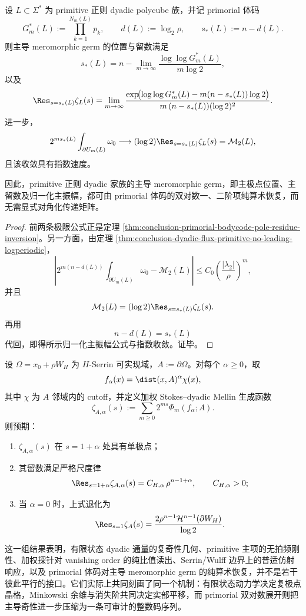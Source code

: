 \begin{theorem}\label{thm:conclusion-primorial-bodycode-dominant-germ-arithmetic-recovery}
设 \(L\subset \Sigma^\ast\) 为 primitive 正则 dyadic polycube 族，并记 primorial 体码
\[
G_m^\ast(L):=\prod_{k=1}^{N_m(L)}p_k,
\qquad
d(L):=\log_2\rho,
\qquad
s_\ast(L):=n-d(L).
\]
则主导 meromorphic germ 的位置与留数满足
\[
s_\ast(L)
=
n-\lim_{m\to\infty}\frac{\log\log G_m^\ast(L)}{m\log 2},
\]
以及
\[
\Res_{s=s_\ast(L)}\zeta_L(s)
=
\lim_{m\to\infty}
\frac{
\exp\!\bigl(\log\log G_m^\ast(L)-m(n-s_\ast(L))\log 2\bigr)
}{
m\,(n-s_\ast(L))(\log 2)^2
}.
\]
进一步，
\[
2^{m s_\ast(L)}\int_{\partial U_m(L)}\omega_0
\longrightarrow
(\log 2)\Res_{s=s_\ast(L)}\zeta_L(s)
=
\mathcal M_2(L),
\]
且该收敛具有指数速度。

因此，primitive 正则 dyadic 家族的主导 meromorphic germ，即主极点位置、主留数及归一化主振幅，都可由 primorial 体码的双对数一、二阶项纯算术恢复，而无需显式对角化传递矩阵。
\end{theorem}
\begin{proof}
前两条极限公式正是定理 \ref{thm:conclusion-primorial-bodycode-pole-residue-inversion}。另一方面，由定理 \ref{thm:conclusion-dyadic-flux-primitive-no-leading-logperiodic}，
\[
\left|
2^{m(n-d(L))}\int_{\partial U_m(L)}\omega_0-\mathcal M_2(L)
\right|
\le
C_0\left(\frac{|\lambda_2|}{\rho}\right)^m,
\]
并且
\[
\mathcal M_2(L)=(\log 2)\Res_{s=s_\ast(L)}\zeta_L(s).
\]
再用
\[
n-d(L)=s_\ast(L)
\]
代回，即得所示归一化主振幅公式与指数收敛。证毕。
\end{proof}

\begin{conjecture}\label{conj:conclusion-serrin-wulff-weighted-mellin-pole-shift}
设 \(\Omega=x_0+\rho W_H\) 为 \(H\)-Serrin 可实现域，\(A:=\partial\Omega\)。对每个 \(\alpha\ge 0\)，取
\[
f_\alpha(x)=\dist(x,A)^\alpha \chi(x),
\]
其中 \(\chi\) 为 \(A\) 邻域内的 cutoff，并定义加权 Stokes--dyadic Mellin 生成函数
\[
\zeta_{A,\alpha}(s):=\sum_{m\ge 0}2^{ms}\Phi_m(f_\alpha;A).
\]
则预期：
\begin{enumerate}
  \item \(\zeta_{A,\alpha}(s)\) 在 \(s=1+\alpha\) 处具有单极点；
  \item 其留数满足严格尺度律
  \[
  \Res_{s=1+\alpha}\zeta_{A,\alpha}(s)=C_{H,\alpha}\,\rho^{n-1+\alpha},
  \qquad
  C_{H,\alpha}>0;
  \]
  \item 当 \(\alpha=0\) 时，上式退化为
  \[
  \Res_{s=1}\zeta_A(s)
  =
  \frac{2\rho^{n-1}\mathcal H^{n-1}(\partial W_H)}{\log 2}.
  \]
\end{enumerate}
\end{conjecture}

\noindent
这一组结果表明，有限状态 dyadic 通量的复奇性几何、primitive 主项的无拍频刚性、加权探针对 vanishing order 的纯比值读出、Serrin/Wulff 边界上的普适仿射响应，以及 primorial 体码对主导 meromorphic germ 的纯算术恢复，并不是若干彼此平行的接口。它们实际上共同刻画了同一个机制：有限状态动力学决定复极点晶格，Minkowski 余维与消失阶共同决定实部平移，而 primorial 双对数展开则把主导奇性进一步压缩为一条可审计的整数码序列。

\endinput
